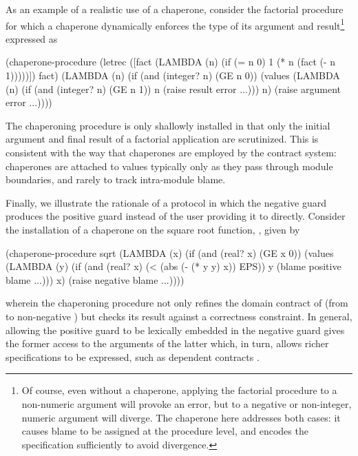 \documentclass{sigplanconf}
\begin{document}
As an example of a realistic use of a chaperone, consider the factorial procedure for which a chaperone dynamically enforces the type of its argument and result\footnote{Of course, even without a chaperone, applying the factorial procedure to a non-numeric argument will provoke an error, but to a negative or non-integer, numeric argument will diverge. The chaperone here addresses both cases: it causes blame to be assigned at the procedure level, and encodes the specification sufficiently to avoid divergence.} expressed as
\begin{schemedisplay}
(chaperone-procedure
 (letrec ([fact (LAMBDA (n)
                  (if (= n 0)
                      1
                      (* n (fact (- n 1)))))])
   fact)
 (LAMBDA (n)
   (if (and (integer? n) (GE n 0))
       (values (LAMBDA (n)
                 (if (and (integer? n) (GE n 1))
                     n
                     (raise result error ...)))
               n)
       (raise argument error ...))))
\end{schemedisplay}
The chaperoning procedure is only shallowly installed in that only the initial argument and final result of a factorial application are scrutinized.
This is consistent with the way that chaperones are employed by the contract system: chaperones are attached to values typically only as they pass through module boundaries, and rarely to track intra-module blame.

Finally, we illustrate the rationale of a protocol in which the negative guard produces the positive guard instead of the user providing it to  directly.
Consider the installation of a chaperone on the square root function, , given by
\begin{schemedisplay}
(chaperone-procedure
 sqrt
 (LAMBDA (x)
   (if (and (real? x) (GE x 0))
       (values (LAMBDA (y)
                 (if (and (real? x) (< (abs (- (* y y) x)) EPS))
                     y
                     (blame positive blame ...)))
               x)
       (raise negative blame ...))))
\end{schemedisplay}
wherein the chaperoning procedure not only refines the domain contract of  (from  to non-negative ) but checks its result against a correctness constraint.
In general, allowing the positive guard to be lexically embedded in the negative guard gives the former access to the arguments of the latter which, in turn, allows richer specifications to be expressed, such as dependent contracts \cite{findler2002contracts}.
\end{document}
